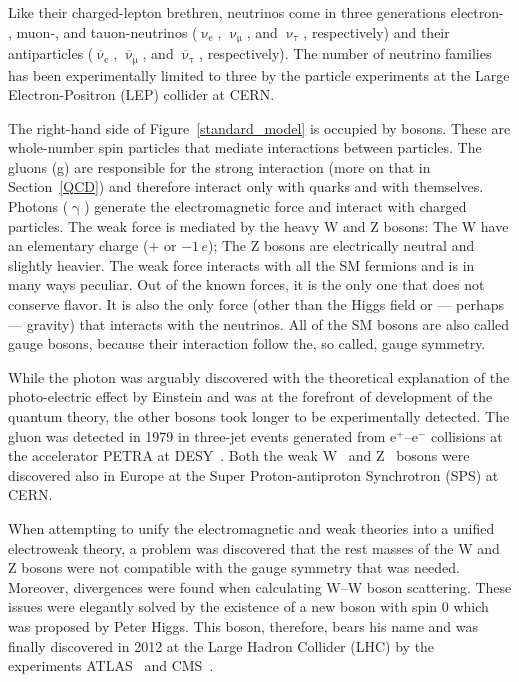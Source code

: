 Like their charged-lepton brethren, neutrinos come in three generations electron- , muon-, and tauon-neutrinos ($\upnu_\mathrm{e}$, $\upnu_\upmu$, and $\upnu_\uptau$, respectively) and their antiparticles ($\overline{\upnu}_\mathrm{e}$, $\overline{\upnu}_\upmu$, and $\overline{\upnu}_\uptau$, respectively). The number of neutrino families has been experimentally limited to three by the particle experiments at the Large Electron-Positron (LEP) collider at CERN\@.

The right-hand side of Figure~\ref{standard_model} is occupied by bosons. These are whole-number spin particles that mediate interactions between particles. The gluons (g) are responsible for the strong interaction (more on that in Section~\ref{QCD}) and therefore interact only with quarks and  with themselves. Photons ($\upgamma$) generate the electromagnetic force and interact with charged particles. The weak force is mediated by the heavy W and Z bosons: The W have an elementary charge ($+$ or $-1\,e$); The Z bosons are electrically neutral and slightly heavier. The weak force interacts with all the SM fermions and is in many ways peculiar. Out of the known forces, it is the only one that does not conserve flavor. It is also the only force (other than the Higgs field or --- perhaps --- gravity) that interacts with the neutrinos. All of the SM bosons are also called gauge bosons, because their interaction follow the, so called, gauge symmetry.

While the photon was arguably discovered with the theoretical explanation of the photo-electric effect by Einstein and was at the forefront of development of the quantum theory, the other bosons took longer to be experimentally detected. The gluon was detected in 1979 in three-jet events generated from e$^+$--e$^-$ collisions at the accelerator PETRA at DESY~\cite{gluons}\@. Both the weak W~\cite{WBosonUA1,WBosonUA2} and Z~\cite{ZDiscovery} bosons were discovered also in Europe at the Super Proton-antiproton Synchrotron (SPS) at CERN\@.

When attempting to unify the electromagnetic and weak theories into a unified electroweak theory, a problem was discovered that the rest masses of the W and Z bosons were not compatible with the gauge symmetry that was needed. Moreover, divergences were found when calculating W--W boson scattering. These issues were elegantly solved by the existence of a new boson with spin 0 which was proposed by Peter Higgs. This boson, therefore, bears his name and was finally discovered in 2012 at the Large Hadron Collider (LHC) by the experiments ATLAS~\cite{HiggsAtlas} and CMS~\cite{HiggsCMS}\@. 


